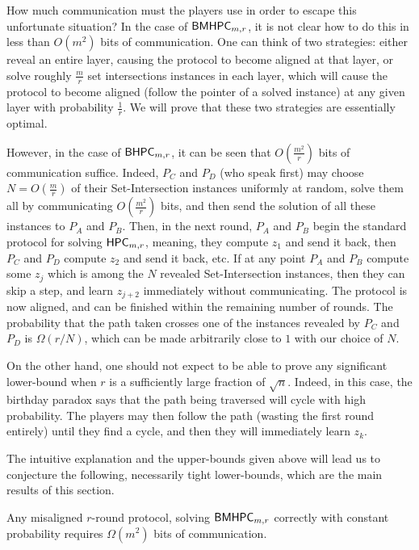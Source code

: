 \documentclass[11pt,letterpaper]{article}
\theoremstyle{definition}
\newcommand{\bhpc}{\ensuremath{\textnormal{\textsf{BHPC}}}\xspace}
\newcommand{\bmhpc}{\ensuremath{\textnormal{\textsf{BMHPC}}}\xspace}
\newcommand{\hpc}{\ensuremath{\textnormal{\textsf{HPC}}}\xspace}
\begin{document}
\medskip\noindent
How much communication must the players use in order to escape this unfortunate situation? In the case of $\bmhpc_{m,r}$, it is not clear how to do this in less than $O(m^2)$ bits of communication. One can think of two strategies: either reveal an entire layer, causing the protocol to become aligned at that layer, or solve roughly $\frac{m}{r}$ set intersections instances in each layer, which will cause the protocol to become aligned (follow the pointer of a solved instance) at any given layer with probability $\frac{1}{r}$. We will prove that these two strategies are essentially optimal.

However, in the case of $\bhpc_{m,r}$, it can be seen that $O(\frac{m^2}{r})$ bits of communication suffice. Indeed, $P_C$ and $P_D$ (who speak first) may choose $N = O(\frac{m}{r})$ of their Set-Intersection instances uniformly at random, solve them all by communicating $O(\frac{m^2}{r})$ bits, and then send the solution of all these instances to $P_A$ and $P_B$. Then, in the next round, $P_A$ and $P_B$ begin the standard protocol for solving $\hpc_{m,r}$, meaning, they compute $z_1$ and send it back, then $P_C$ and $P_D$ compute $z_2$ and send it back, etc. If at any point $P_A$ and $P_B$ compute some $z_j$ which is among the $N$ revealed Set-Intersection instances, then they can skip a step, and learn $z_{j+2}$ immediately without communicating. The protocol is now aligned, and can be finished within the remaining number of rounds. The probability that the path taken crosses one of the instances revealed by $P_C$ and $P_D$ is $\Omega(r/ N)$, which can be made arbitrarily close to $1$ with our choice of $N$.

On the other hand, one should not expect to be able to prove any significant lower-bound when $r$ is a sufficiently large fraction of $\sqrt n$. Indeed, in this case, the birthday paradox says that the path being traversed will cycle with high probability. The players may then follow the path (wasting the first round entirely) until they find a cycle, and then they will immediately learn $z_k$.

\medskip\noindent
The intuitive explanation and the upper-bounds given above will lead us to conjecture the following, necessarily tight lower-bounds, which are the main results of this section.


 \begin{theorem} \label{thm:lb-mhpc}
 Any misaligned $r$-round protocol, solving $\bmhpc_{m,r}$ correctly with constant probability requires $\Omega(m^2)$ bits of communication.
 \end{theorem}
\end{document}
